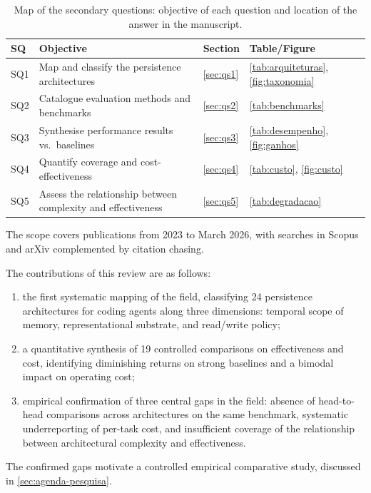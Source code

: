 \begin{table}[htbp]
\centering
\caption{Map of the secondary questions: objective of each question and
location of the answer in the manuscript.}
\label{tab:mapa-rqs}
\small
\begin{tabularx}{\textwidth}{l X l l}
\toprule
\textbf{SQ} & \textbf{Objective} & \textbf{Section} & \textbf{Table/Figure} \\
\midrule
SQ1 & Map and classify the persistence architectures &
  \autoref{sec:qs1} & \autoref{tab:arquiteturas}, \autoref{fig:taxonomia} \\
SQ2 & Catalogue evaluation methods and benchmarks &
  \autoref{sec:qs2} & \autoref{tab:benchmarks} \\
SQ3 & Synthesise performance results vs.\ baselines &
  \autoref{sec:qs3} & \autoref{tab:desempenho}, \autoref{fig:ganhos} \\
SQ4 & Quantify coverage and cost-effectiveness &
  \autoref{sec:qs4} & \autoref{tab:custo}, \autoref{fig:custo} \\
SQ5 & Assess the relationship between complexity and effectiveness &
  \autoref{sec:qs5} & \autoref{tab:degradacao} \\
\bottomrule
\end{tabularx}
\end{table}

\noindent The scope covers publications from 2023 to March 2026, with
searches in Scopus and arXiv complemented by citation chasing.

The contributions of this review are as follows:

\begin{enumerate}
  \item the first systematic mapping of the field, classifying 24
    persistence architectures for coding agents along three dimensions:
    temporal scope of memory, representational substrate, and
    read/write policy;
  \item a quantitative synthesis of 19 controlled comparisons on
    effectiveness and cost, identifying diminishing returns on strong
    baselines and a bimodal impact on operating cost;
  \item empirical confirmation of three central gaps in the field:
    absence of head-to-head comparisons across architectures on the
    same benchmark, systematic underreporting of per-task cost, and
    insufficient coverage of the relationship between architectural
    complexity and effectiveness.
\end{enumerate}

The confirmed gaps motivate a controlled empirical comparative study,
discussed in \autoref{sec:agenda-pesquisa}.
